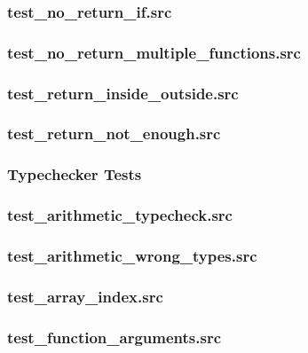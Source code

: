 \documentclass[a4paper,10pt,titlepage]{report}
\begin{document}
\subsubsection{test_no_return_if.src}


\subsubsection{test_no_return_multiple_functions.src}


\subsubsection{test_return_inside_outside.src}


\subsubsection{test_return_not_enough.src}


\subsubsection{Typechecker Tests}
\subsubsection{test_arithmetic_typecheck.src}


\subsubsection{test_arithmetic_wrong_types.src}


\subsubsection{test_array_index.src}


\subsubsection{test_function_arguments.src}

\end{document}
